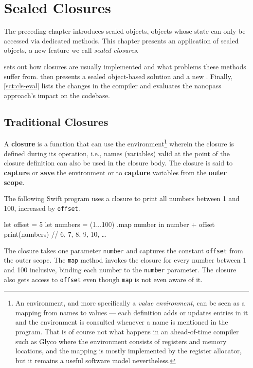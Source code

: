 \documentclass[main.tex]{subfiles}
\begin{document}
\onlyinsubfile{\mainmatter{}}

\chapter{Sealed Closures} \label{ch:cls}
The preceding chapter introduces sealed objects, objects whose state can only be accessed via dedicated methods. This chapter presents an application of sealed objects, a new feature we call \emph{sealed closures}.

 sets out how closures are usually implemented and what problems these methods suffer from.  then presents a sealed object-based solution and a new . Finally, \cref{sct:cls-eval} lists the changes in the compiler and evaluates the nanopass approach's impact on the codebase.

\section{Traditional Closures} \label{sct:cls-trad}
A \textbf{closure} is a function that can use the environment\footnote{An environment, and more specifically a \emph{value environment}, can be seen as a mapping from names to values — each definition adds or updates entries in it and the environment is consulted whenever a name is mentioned in the program. That is of course not what happens in an ahead-of-time compiler such as Glyco where the environment consists of registers and memory locations, and the mapping is mostly implemented by the register allocator, but it remains a useful software model nevertheless.} wherein the closure is defined during its operation, i.e., names (variables) valid at the point of the closure definition can also be used in the closure body. The closure is said to \textbf{capture} or \textbf{save} the environment or to \textbf{capture} variables from the \textbf{outer scope}.

The following Swift program uses a closure to print all numbers between 1 and 100, increased by \texttt{offset}.
\begin{swift}
	let offset = 5
	let numbers = (1...100)
		.map { number in number + offset }
	print(numbers)		// 6, 7, 8, 9, 10, …
\end{swift}
The closure takes one parameter \texttt{number} and captures the constant \texttt{offset} from the outer scope. The \texttt{map} method invokes the closure for every number between 1 and 100 inclusive, binding each number to the \texttt{number} parameter. The closure also gets access to \texttt{offset} even though \texttt{map} is not even aware of it.
\end{document}

